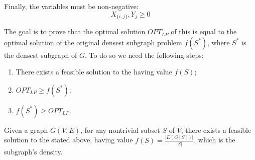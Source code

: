 Finally, the variables must be non-negative:
\begin{equation}
    X_{\{i, j\}}, Y_j \geq 0
\end{equation}

The goal is to prove that the optimal solution $OPT_{LP}$ of this \lp{} is equal to the optimal solution of the original densest subgraph problem $f(S^*)$, where $S^*$ is the densest subgraph of $G$. To do so we need the following steps:
\begin{enumerate}
    \item There exists a feasible solution to the \lp{} having value $f(S)$;
    \item $OPT_{LP} \geq f(S^*)$;
    \item $f(S^*) \geq OPT_{LP}$.
\end{enumerate}

\begin{lemma}\label{lem:dsp-feasibility}
    Given a graph $G(V, E)$, for any nontrivial subset $S$ of $V$, there exists a feasible solution to the \lp{} stated above, having value $f(S) = \frac{|E(G[S])|}{|S|}$, which is the subgraph's density.
\end{lemma}

